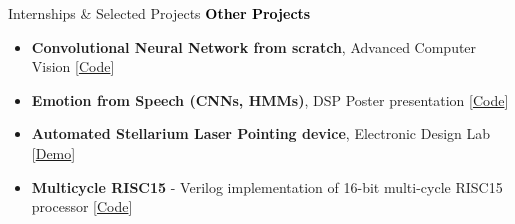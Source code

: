 \documentclass{resume} %
\begin{document}
\begin{rSection}{Internships \& Selected Projects}
\textcolor{Black}{\textbf{Other Projects}}\\
\vspace{-16pt}
\begin{itemize}[leftmargin=*]
    \setlength\itemsep{-3pt}
    \item \textbf{Convolutional Neural Network from scratch}, Advanced Computer Vision [\href{https://github.com/yashbhalgat/Convolutional-Neural-Net}{Code}]
    \item \textbf{Emotion from Speech (CNNs, HMMs)}, DSP Poster presentation [\href{https://github.com/yashbhalgat/Emotion-from-speech-MFCC}{Code}]
    \item \textbf{Automated Stellarium Laser Pointing device}, Electronic Design Lab [\href{https://www.youtube.com/watch?v=KEhirwSOlVI&t=167s}{Demo}]
    \item \textbf{Multicycle RISC15} - Verilog implementation of 16-bit multi-cycle RISC15 processor [\href{https://github.com/yashbhalgat/Multicycle-RISC-Processor}{Code}]
\end{itemize}

\end{rSection}

\vspace*{-8pt}



\end{document}
